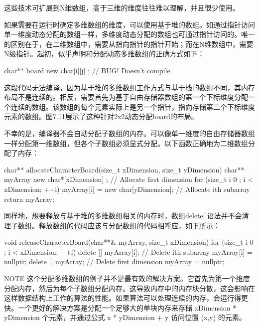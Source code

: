这些技术可扩展到N维数组，高于三维的维度往往难以理解，并且很少使用。




如果需要在运行时确定多维数组的维度，可以使用基于堆的数组。如通过指针访问单一维度动态分配的数组一样，多维度动态分配的数组也可通过指针访问的。唯一的区别在于，在二维数组中，需要从指向指针的指针开始；而在N维数组中，需要N级指针。起初，似乎声明和分配动态多维数组的正确方式如下：

\begin{cpp}
char** board { new char[i][j] }; // BUG! Doesn't compile
\end{cpp}

这段代码无法编译，因为基于堆的多维数组工作方式与基于栈的数组不同，其内存布局不是连续的。相反，需要首先为基于自由存储器数组的第一个下标维度分配一个连续的数组。该数组的每个元素实际上是另一个指针，指向存储第二个下标维度元素的数组。图7.11展示了这种针对2x2动态分配board的布局。


不幸的是，编译器不会自动分配子数组的内存。可以像单一维度的自由存储器数组一样分配第一维数组，但各个子数组必须显式分配。以下函数正确地为二维数组分配了内存：

\begin{cpp}
char** allocateCharacterBoard(size_t xDimension, size_t yDimension)
{
    char** myArray { new char*[xDimension] }; // Allocate first dimension
    for (size_t i { 0 }; i < xDimension; ++i) {
        myArray[i] = new char[yDimension]; // Allocate ith subarray
    }
    return myArray;
}
\end{cpp}

同样地，想要释放与基于堆的多维数组相关的内存时，数组delete[]语法并不会清理子数组。释放数组的代码应该与分配数组的代码相呼应，如下所示：

\begin{cpp}
void releaseCharacterBoard(char**& myArray, size_t xDimension)
{
    for (size_t i { 0 }; i < xDimension; ++i) {
        delete [] myArray[i]; // Delete ith subarray
        myArray[i] = nullptr;
    }
    delete [] myArray; // Delete first dimension
    myArray = nullptr;
}
\end{cpp}

\begin{myNotic}{NOTE}
这个分配多维数组的例子并不是最有效的解决方案。它首先为第一个维度分配内存，然后为每个子数组分配内存。这导致内存中的内存块分散，这会影响在这样数据结构上工作的算法的性能。如果算法可以处理连续的内存，会运行得更快。一个更好的解决方案是分配一个足够大的单块内存来存储 xDimension * yDimension 个元素，并通过公式 x * yDimension + y 访问位置 (x,y) 的元素。
\end{myNotic}

